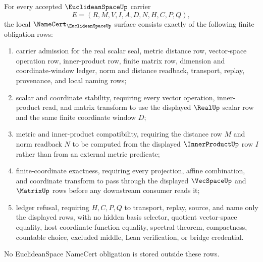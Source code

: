 \begin{theorem}
\label{thm:euclidean-space-namecert-obligations}
For every accepted $\EuclideanSpaceUp$ carrier
$$
E=(R,M,V,I,A,D,N,H,C,P,Q),
$$
the local $\NameCert_{\EuclideanSpaceUp}$ surface consists exactly of the following finite obligation rows:
\begin{enumerate}
\item carrier admission for the real scalar seal, metric distance row, vector-space operation row, inner-product row, finite matrix row, dimension and coordinate-window ledger, norm and distance readback, transport, replay, provenance, and local naming rows;
\item scalar and coordinate stability, requiring every vector operation, inner-product read, and matrix transform to use the displayed $\RealUp$ scalar row and the same finite coordinate window $D$;
\item metric and inner-product compatibility, requiring the distance row $M$ and norm readback $N$ to be computed from the displayed $\InnerProductUp$ row $I$ rather than from an external metric predicate;
\item finite-coordinate exactness, requiring every projection, affine combination, and coordinate transform to pass through the displayed $\VecSpaceUp$ and $\MatrixUp$ rows before any downstream consumer reads it;
\item ledger refusal, requiring $H,C,P,Q$ to transport, replay, source, and name only the displayed rows, with no hidden basis selector, quotient vector-space equality, host coordinate-function equality, spectral theorem, compactness, countable choice, excluded middle, Lean verification, or bridge credential.
\end{enumerate}
No EuclideanSpace NameCert obligation is stored outside these rows.
\end{theorem}
